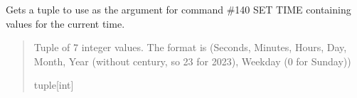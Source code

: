 \documentclass[letterpaper,10pt,english]{sphinxmanual}
\begin{document}
\begin{fulllineitems}
\begin{fulllineitems}
\end{fulllineitems}


\begin{fulllineitems}
\label{\detokenize{Morelia.Devices:Morelia.Devices.PodDevice_8229.Pod8229.GetCurrentTime}}
\pysigstartsignatures
{}
\pysigstopsignatures
\sphinxAtStartPar
Gets a tuple to use as the argument for command \#140 SET TIME containing values for the current time.
\begin{quote}\begin{description}
\sphinxAtStartPar
Tuple of 7 integer values. The format is (Seconds, Minutes, Hours, Day, Month, Year                 (without century, so 23 for 2023), Weekday (0 for Sunday))

\sphinxAtStartPar
tuple{[}int{]}

\end{description}\end{quote}

\end{fulllineitems}



\end{fulllineitems}
\end{document}
